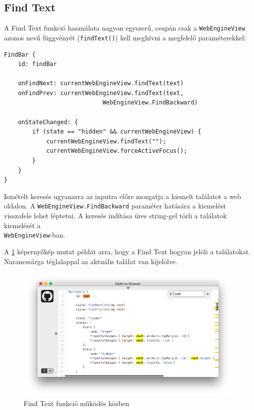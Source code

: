 \documentclass[12pt]{report}
\begin{document}
\subsection{Find Text}

A Find Text funkció használata nagyon egyszerű, csupán csak a \texttt{WebEngineView} azonos
nevű függvényét (\texttt{findText()}) kell meghívni a megfelelő paraméterekkel:
\begin{lstlisting}[title=main.qml]
FindBar {
    id: findBar

    onFindNext: currentWebEngineView.findText(text)
    onFindPrev: currentWebEngineView.findText(text,
                            WebEngineView.FindBackward)

    onStateChanged: {
        if (state == "hidden" && currentWebEngineView) {
            currentWebEngineView.findText("");
            currentWebEngineView.forceActiveFocus();
        }
    }
}
\end{lstlisting}
Ismételt keresés ugyanarra az inputra előre mozgatja a kiemelt találatot a web oldalon. A
\texttt{WebEngineView.FindBackward} paraméter hatására a kiemelést visszafele lehet léptetni.
A keresés indítása üres string-gel törli a találatok kiemelését a \\
\texttt{WebEngineView}-ban.

A \ref{fig:find-bar-screen} képernyőkép mutat példát arra, hogy a Find Text hogyan jelöli
a találatokat. Narancssárga téglalappal az aktuális találat van kijelölve.

\begin{figure}[ht]
    \centering
    \includegraphics[scale=0.5]{FindBar-screen}
    \caption{
        \label{fig:find-bar-screen}
        Find Text funkció működés közben
    }
\end{figure}
\end{document}
